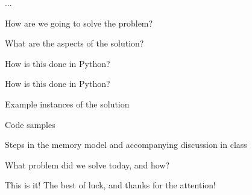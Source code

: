 \documentclass{beamer}
\begin{document}
\begin{slide}{
\item ...
}\end{slide}

\begin{slide}{
\item How are we going to solve the problem?
}\end{slide}

\begin{slide}{
\item What are the aspects of the solution?
}\end{slide}

\begin{slide}{
\item How is this done in Python?
}\end{slide}

\begin{slide}{
\item How is this done in Python?
}\end{slide}

\begin{slide}{
\item Example instances of the solution
\item Code samples
\item Steps in the memory model and accompanying discussion in class
}\end{slide}

\begin{slide}{
\item What problem did we solve today, and how?
}\end{slide}

\begin{frame}{This is it!}
\center
\fontsize{18pt}{7.2}\selectfont
The best of luck, and thanks for the attention!
\end{frame}
\end{document}
